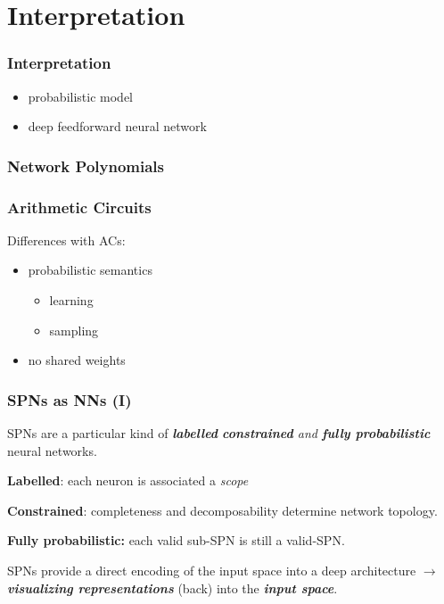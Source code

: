 \documentclass[10pt, t, xcolor={usenames,dvipsnames,svgnames}, compress]{beamer}
\begin{document}
\section{Interpretation}
{
  \begin{frame}[c]
    \sectionpage
  \end{frame}
}

\begin{frame}
\frametitle{Interpretation}
\begin{itemize}
\item probabilistic model
\item deep feedforward neural network
\end{itemize}
\end{frame}


\begin{frame}
\frametitle{Network Polynomials}
\end{frame}

\begin{frame}
  \frametitle{Arithmetic Circuits}
  Differences with ACs:
  \begin{itemize}
  \item probabilistic semantics
    \begin{itemize}
    \item learning
      \item sampling
    \end{itemize}
    \item no shared weights
  \end{itemize}
\end{frame}

\begin{frame}[t]
  \frametitle{SPNs as NNs (I)}
  SPNs are a particular kind of \emph{\textbf{labelled}
    \textbf{constrained} and \textbf{fully probabilistic}}
  neural networks.\par\bigskip
  
  \textbf{Labelled}: each neuron is associated a \emph{scope}\par
  \textbf{Constrained}: completeness and decomposability determine
  network topology.\par
  \textbf{Fully probabilistic:} each valid sub-SPN is still a
  valid-SPN.\par\bigskip
  
  SPNs provide a direct encoding of the input space into a deep
  architecture $\rightarrow$ \emph{\textbf{visualizing representations}} (back) into the \emph{\textbf{input space}}.
\end{frame}
\end{document}
